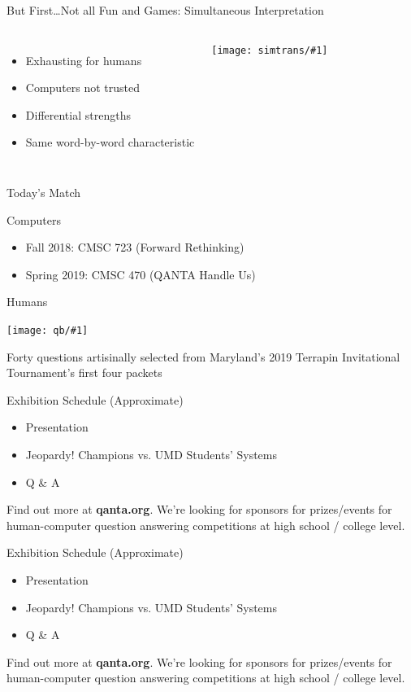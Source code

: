 \documentclass[aspectratio=169,xcolor=dvipsnames]{beamer}
\newcommand{\schedule}[0]{
\begin{frame}{Exhibition Schedule (Approximate)}

  \begin{itemize}
     \item[17:00] Presentation
     \item[17:20] Jeopardy! Champions vs. UMD Students' Systems
     \item[18:00] Q \& A
  \end{itemize}

  Find out more at {\bf qanta.org}.  We're looking for sponsors for
  prizes/events for human-computer question answering competitions at high school /
  college level.

\end{frame}
}
\newcommand{\gfxs}[2]{
\begin{center}
	\texttt{[image: simtrans/\#1]}
\end{center}
}
\newcommand{\gfxq}[2]{
\begin{center}
	\texttt{[image: qb/\#1]}
\end{center}
}
\begin{document}
\begin{frame}{But First\dots Not all Fun and Games: Simultaneous Interpretation}

  \begin{columns}
  \begin{itemize}
    \item Exhausting for humans
    \item Computers not trusted
    \item Differential strengths
    \item Same word-by-word characteristic
  \end{itemize}

 \gfxs{computer-interpreter}{1.0}
 \end{columns}
\end{frame}

\begin{frame}{Today's Match}

  \begin{block}{Computers}
    \begin{itemize}
    \item Fall 2018: CMSC 723 (Forward Rethinking)
    \item Spring 2019: CMSC 470 (QANTA
      Handle Us)
    \end{itemize}
  \end{block}

  \begin{block}{Humans}
    \gfxq{2019_may_expo}{.8}
  \end{block}

  Forty questions artisinally selected from Maryland's 2019 Terrapin
  Invitational Tournament's first four packets
  
\end{frame}

\schedule{}




\schedule{}


\end{document}
